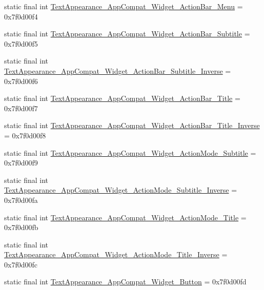\begin{DoxyCompactItemize}
\item 
static final int \mbox{\hyperlink{classandroid_1_1support_1_1v7_1_1appcompat_1_1R_1_1style_a42bd18afa75f3029cd3cba58b6dbbd97}{Text\+Appearance\+\_\+\+App\+Compat\+\_\+\+Widget\+\_\+\+Action\+Bar\+\_\+\+Menu}} = 0x7f0d00f4
\item 
static final int \mbox{\hyperlink{classandroid_1_1support_1_1v7_1_1appcompat_1_1R_1_1style_a060fdc4b1fab528d2a11af1ff7af10a8}{Text\+Appearance\+\_\+\+App\+Compat\+\_\+\+Widget\+\_\+\+Action\+Bar\+\_\+\+Subtitle}} = 0x7f0d00f5
\item 
static final int \mbox{\hyperlink{classandroid_1_1support_1_1v7_1_1appcompat_1_1R_1_1style_ad09887d0863f622563a04c345872e644}{Text\+Appearance\+\_\+\+App\+Compat\+\_\+\+Widget\+\_\+\+Action\+Bar\+\_\+\+Subtitle\+\_\+\+Inverse}} = 0x7f0d00f6
\item 
static final int \mbox{\hyperlink{classandroid_1_1support_1_1v7_1_1appcompat_1_1R_1_1style_a85ad5971aea90f7ccb526eb8740109e5}{Text\+Appearance\+\_\+\+App\+Compat\+\_\+\+Widget\+\_\+\+Action\+Bar\+\_\+\+Title}} = 0x7f0d00f7
\item 
static final int \mbox{\hyperlink{classandroid_1_1support_1_1v7_1_1appcompat_1_1R_1_1style_aae56fc22cd4a5422e5bbd3527cdfbca8}{Text\+Appearance\+\_\+\+App\+Compat\+\_\+\+Widget\+\_\+\+Action\+Bar\+\_\+\+Title\+\_\+\+Inverse}} = 0x7f0d00f8
\item 
static final int \mbox{\hyperlink{classandroid_1_1support_1_1v7_1_1appcompat_1_1R_1_1style_ae80b6fd99f5c558c8631bf51e84be10f}{Text\+Appearance\+\_\+\+App\+Compat\+\_\+\+Widget\+\_\+\+Action\+Mode\+\_\+\+Subtitle}} = 0x7f0d00f9
\item 
static final int \mbox{\hyperlink{classandroid_1_1support_1_1v7_1_1appcompat_1_1R_1_1style_ace2e9bee4fbb10f73b009e25320c6497}{Text\+Appearance\+\_\+\+App\+Compat\+\_\+\+Widget\+\_\+\+Action\+Mode\+\_\+\+Subtitle\+\_\+\+Inverse}} = 0x7f0d00fa
\item 
static final int \mbox{\hyperlink{classandroid_1_1support_1_1v7_1_1appcompat_1_1R_1_1style_a8916bfb355f4339b9c42ba1331eb478d}{Text\+Appearance\+\_\+\+App\+Compat\+\_\+\+Widget\+\_\+\+Action\+Mode\+\_\+\+Title}} = 0x7f0d00fb
\item 
static final int \mbox{\hyperlink{classandroid_1_1support_1_1v7_1_1appcompat_1_1R_1_1style_aac3e1610afd8a4516c6eccd16ee4476f}{Text\+Appearance\+\_\+\+App\+Compat\+\_\+\+Widget\+\_\+\+Action\+Mode\+\_\+\+Title\+\_\+\+Inverse}} = 0x7f0d00fc
\item 
static final int \mbox{\hyperlink{classandroid_1_1support_1_1v7_1_1appcompat_1_1R_1_1style_a727c66b567829dccd9c00810cf31f225}{Text\+Appearance\+\_\+\+App\+Compat\+\_\+\+Widget\+\_\+\+Button}} = 0x7f0d00fd

\end{DoxyCompactItemize}
